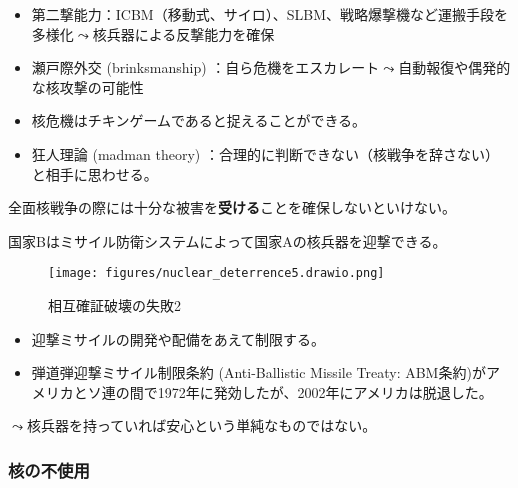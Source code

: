 \documentclass[
  xelatex,
  ja=standard]{bxjsarticle}
\providecommand{\tightlist}{%
  \setlength{\itemsep}{0pt}\setlength{\parskip}{0pt}}\usepackage{longtable,booktabs,array}
\begin{document}
\begin{itemize}
\tightlist
\item
  第二撃能力：ICBM（移動式、サイロ）、SLBM、戦略爆撃機など運搬手段を多様化\(\leadsto\)核兵器による反撃能力を確保
\item
  瀬戸際外交 (brinksmanship)
  ：自ら危機をエスカレート\(\leadsto\)自動報復や偶発的な核攻撃の可能性\citep{schelling2008, schelling2018}
\item
  核危機はチキンゲームであると捉えることができる。
\item
  狂人理論 (madman theory)
  ：合理的に判断できない（核戦争を辞さない）と相手に思わせる。
\end{itemize}

全面核戦争の際には十分な被害を\textbf{受ける}ことを確保しないといけない。

\begin{tcolorbox}[enhanced jigsaw, left=2mm, coltitle=black, bottomtitle=1mm, colback=white, titlerule=0mm, breakable, leftrule=.75mm, opacitybacktitle=0.6, rightrule=.15mm, colbacktitle=quarto-callout-tip-color!10!white, arc=.35mm, colframe=quarto-callout-tip-color-frame, title=\textcolor{quarto-callout-tip-color}{\faLightbulb}\hspace{0.5em}{相互確証破壊の失敗2}, toptitle=1mm, toprule=.15mm, bottomrule=.15mm, opacityback=0]

国家Bはミサイル防衛システムによって国家Aの核兵器を迎撃できる。

\end{tcolorbox}

\begin{figure}[htpb]

{\centering \texttt{[image: figures/nuclear\_deterrence5.drawio.png]}

}

\caption{相互確証破壊の失敗2}

\end{figure}

\begin{itemize}
\tightlist
\item
  迎撃ミサイルの開発や配備をあえて制限する。
\item
  弾道弾迎撃ミサイル制限条約 (Anti-Ballistic Missile Treaty:
  ABM条約)がアメリカとソ連の間で1972年に発効したが、2002年にアメリカは脱退した。
\end{itemize}

\(\leadsto\)核兵器を持っていれば安心という単純なものではない。

\hypertarget{ux6838ux306eux4e0dux4f7fux7528}{%
\subsubsection{核の不使用}\label{ux6838ux306eux4e0dux4f7fux7528}}
\end{document}
